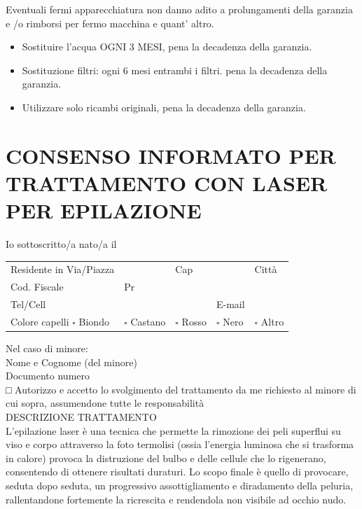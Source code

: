 \documentclass[10pt]{article}
\begin{document}
Eventuali fermi apparecchiatura non danno adito a prolungamenti della garanzia e /o rimborsi per fermo macchina e quant' altro.

\begin{itemize}
  \item Sostituire l'acqua OGNI 3 MESI, pena la decadenza della garanzia.
  \item Sostituzione filtri: ogni 6 mesi entrambi i filtri. pena la decadenza della garanzia.
  \item Utilizzare solo ricambi originali, pena la decadenza della garanzia.
\end{itemize}

\section{CONSENSO INFORMATO PER TRATTAMENTO CON LASER PER EPILAZIONE}
Io sottoscritto/a nato/a il

\begin{center}
\begin{tabular}{lllll}
Residente in Via/Piazza &  & Cap &  & Città \\
Cod. Fiscale & Pr &  &  &  \\
Tel/Cell &  &  & E-mail &  \\
Colore capelli $\square$ Biondo & $\square$ Castano & $\square$ Rosso & $\square$ Nero & $\square$ Altro \\
\end{tabular}
\end{center}

Nel caso di minore:\\
Nome e Cognome (del minore)\\
Documento numero\\
□ Autorizzo e accetto lo svolgimento del trattamento da me richiesto al minore di cui sopra, assumendone tutte le responsabilità\\
DESCRIZIONE TRATTAMENTO\\
L'epilazione laser è una tecnica che permette la rimozione dei peli superflui su viso e corpo attraverso la foto termolisi (ossia l'energia luminosa che si trasforma in calore) provoca la distruzione del bulbo e delle cellule che lo rigenerano, consentendo di ottenere risultati duraturi. Lo scopo finale è quello di provocare, seduta dopo seduta, un progressivo assottigliamento e diradamento della peluria, rallentandone fortemente la ricrescita e rendendola non visibile ad occhio nudo.
\end{document}
